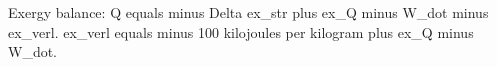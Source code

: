 Exergy balance:  
Q equals minus Delta ex_str plus ex_Q minus W_dot minus ex_verl.  
ex_verl equals minus 100 kilojoules per kilogram plus ex_Q minus W_dot.
